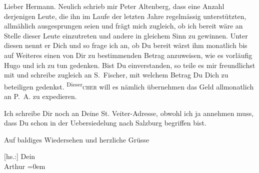 \pstart{}Lieber Hermann.\pend\vspace{0.5em}
\pstart
           Neulich schrieb mir Peter Altenberg, dass eine
               Anzahl derjenigen Leute, die ihn im Laufe der letzten Jahre regelmässig
               unterstützten, allmählich ausgesprungen seien und frägt mich zugleich, ob ich bereit
               wäre an Stelle dieser Leute einzutreten und andere in gleichem Sinn zu gewinnen.
               Unter diesen nennt er Dich und so frage ich an, ob Du bereit wärst ihm monatlich bis
               auf Weiteres einen von Dir zu bestimmenden Betrag anzuweisen, wie es vorläufig Hugo und ich zu tun gedenken. Bist Du
               einverstanden, so teile es mir freundlichst mit und schreibe zugleich an S. Fischer, mit welchem Betrag Du Dich zu
               beteiligen ge{\pb}denkst. \substVorne{}\textsuperscript{Dieser}\substDazwischen{}\textsc{cher}\substHinten{} will es nämlich übernehmen das Geld allmonatlich an P. A. zu expedieren.\pend
           
\pstart
           Ich schreibe Dir noch an Deine St.
               Veiter-Adresse, obwohl ich ja annehmen muss, dass Du schon in der Uebersiedelung
               nach Salzburg begriffen bist.\pend
           
\pstart
           Auf baldiges Wiedersehen und herzliche Grüsse\pend
           
\pstart
           {[}hs.:{]} Dein{\\[\baselineskip]}\spacefill\mbox{Arthur}\pend
           \leftskip=0em{}\endnumbering{}  
      